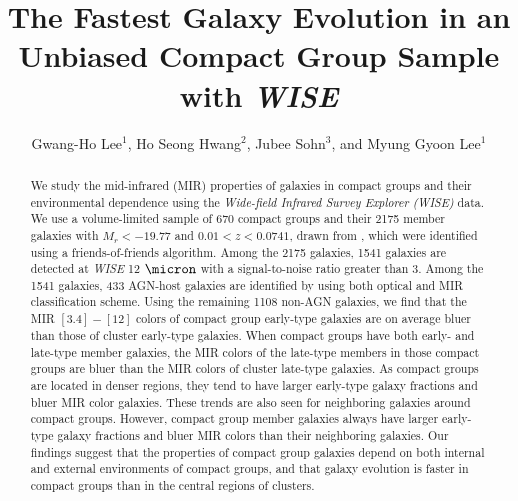 \documentclass[12pt,preprint,apj]{emulateapj}
\begin{document}

\title{The Fastest Galaxy Evolution in an Unbiased Compact Group Sample with \textit{WISE}}


\author{Gwang-Ho Lee$^{1}$, Ho Seong Hwang$^{2}$, Jubee Sohn$^{3}$, and Myung Gyoon Lee$^{1}$} 




\begin{abstract}

We study the mid-infrared (MIR) properties of galaxies 
in compact groups and their environmental dependence 
using the \textit{Wide-field Infrared Survey Explorer (WISE)} data.
We use a volume-limited sample of 670 compact groups and 
their 2175 member galaxies with $M_r< -19.77$ and $0.01<z<0.0741$, 
drawn from \citet{sohn+16}, which were identified using a friends-of-friends algorithm.
Among the 2175 galaxies, 1541 galaxies are detected at 
\textit{WISE} 12 $\micron$ with a signal-to-noise ratio greater than 3.
Among the 1541 galaxies, 433 AGN-host galaxies are identified by using both 
optical and MIR classification scheme.
Using the remaining 1108 non-AGN galaxies, we find that the MIR $[3.4]-[12]$ colors of compact group early-type galaxies 
are on average bluer than those of cluster early-type galaxies.
When compact groups have both early- and late-type member galaxies, 
the MIR colors of the late-type members in those compact groups
are bluer than the MIR colors of cluster late-type galaxies.
As compact groups are located in denser regions,
they tend to have larger early-type galaxy fractions
and bluer MIR color galaxies. 
These trends are also seen for neighboring galaxies around compact groups.
However, compact group member galaxies always have larger 
early-type galaxy fractions and bluer MIR colors than their neighboring galaxies.
Our findings suggest that the properties of compact group galaxies depend on 
both internal and external environments of compact groups, 
and that galaxy evolution is faster in compact groups than in the central regions of clusters.

\end{abstract}
\end{document}

